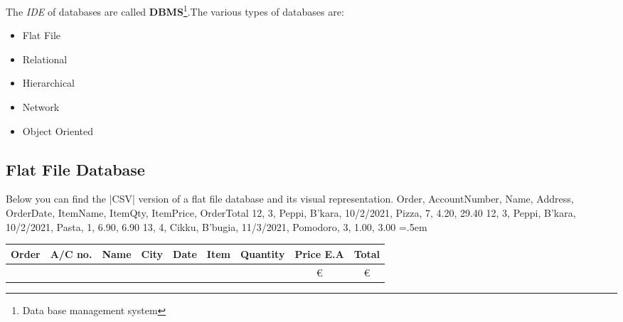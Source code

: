 \documentclass{article}
\newenvironment{lcverbatim}
{\SaveVerbatim{cverb}}
{\endSaveVerbatim
	\flushleft\fboxrule=0pt\fboxsep=.5em
	\colorbox{cverbbg}{%
		\makebox[\dimexpr\linewidth-2\fboxsep][l]{\BUseVerbatim{cverb}}%
	}
	\endflushleft
}
\begin{document}
		The \textit{IDE} of databases are called \textbf{DBMS}\footnote{Data base management system}.The various types of databases are: 
		\begin{itemize}
			\item{Flat File}
			\item{Relational}
			\item{Hierarchical}
			\item{Network}
			\item{Object Oriented}
		\end{itemize}
	\subsection{Flat File Database}
	Below you can find the \cverb|CSV| version of a flat file database and its visual representation.
\begin{lcverbatim}
Order, AccountNumber, Name, Address, OrderDate, ItemName, ItemQty, ItemPrice, OrderTotal
12, 3, Peppi, B'kara, 10/2/2021, Pizza, 7, 4.20, 29.40
12, 3, Peppi, B'kara, 10/2/2021, Pasta, 1, 6.90, 6.90 
13, 4, Cikku, B'bugia, 11/3/2021, Pomodoro, 3, 1.00, 3.00
\end{lcverbatim}
\begin{center}
		\begin{tabular}{|c|c|c|c|c|c|c|c|c|}%
		\hline
		\bfseries Order & \bfseries A/C no. & \bfseries Name &\bfseries City &\bfseries Date & \bfseries Item &\bfseries Quantity &\bfseries Price E.A &\bfseries Total 
		\csvreader[head to column names]{flat_file.csv}{}%
		{\\\hline\Order & \AccountNumber &  \Name & \Address & \OrderDate & \ItemName & \ItemQty & \euro\ItemPrice & \euro\OrderTotal}
		\\\hline
	\end{tabular}
\end{center}
\end{document}
